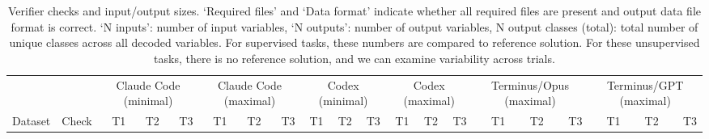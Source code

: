 \begin{table}[t]
\centering
\setlength{\tabcolsep}{4pt}
\begin{tabular}{l l rrr rrr rrr rrr rrr rrr}
\toprule
 & & \multicolumn{3}{c}{Claude Code (minimal)} & \multicolumn{3}{c}{Claude Code (maximal)} & \multicolumn{3}{c}{Codex (minimal)} & \multicolumn{3}{c}{Codex (maximal)} & \multicolumn{3}{c}{Terminus/Opus (maximal)} & \multicolumn{3}{c}{Terminus/GPT (maximal)} \\
\cmidrule(lr){3-5} \cmidrule(lr){6-8} \cmidrule(lr){9-11} \cmidrule(lr){12-14} \cmidrule(lr){15-17} \cmidrule(lr){18-20}
Dataset & Check & T1 & T2 & T3 & T1 & T2 & T3 & T1 & T2 & T3 & T1 & T2 & T3 & T1 & T2 & T3 & T1 & T2 & T3 \\
\midrule
\bottomrule
\end{tabular}
\caption{Verifier checks and input/output sizes. `Required files' and `Data format' indicate whether all required files are present and output data file format is correct. `N inputs': number of input variables, `N outputs': number of output variables, N output classes (total): total number of unique classes across all decoded variables. For supervised tasks, these numbers are compared to reference solution. For these unsupervised tasks, there is no reference solution, and we can examine variability across trials. }
\label{tab:checks-unsupervised}
\end{table}
